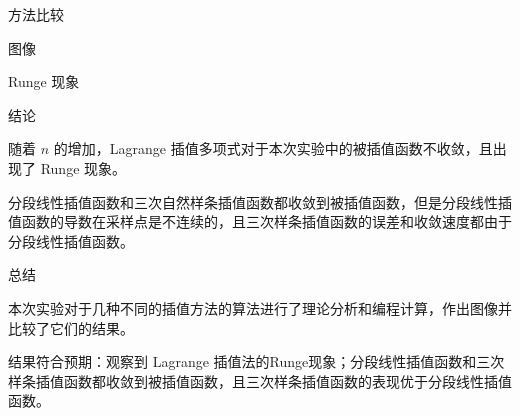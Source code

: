 \documentclass[a4paper]{article}
\begin{document}
\begin{multicols}{2}
\begin{section}{方法比较}
\begin{subsection}{图像}
\begin{subsubsection}{Runge 现象}
		\end{subsubsection}
		
	\end{subsection}
	
	\begin{subsection}{结论}
	
		随着 $n$ 的增加，Lagrange 插值多项式对于本次实验中的被插值函数不收敛，且出现了 Runge 现象。
		
		分段线性插值函数和三次自然样条插值函数都收敛到被插值函数，但是分段线性插值函数的导数在采样点是不连续的，且三次样条插值函数的误差和收敛速度都由于分段线性插值函数。
		
	\end{subsection}
	
\end{section}
	
\begin{section}{总结}
	
	本次实验对于几种不同的插值方法的算法进行了理论分析和编程计算，作出图像并比较了它们的结果。
	
	结果符合预期：观察到 Lagrange 插值法的Runge现象；分段线性插值函数和三次样条插值函数都收敛到被插值函数，且三次样条插值函数的表现优于分段线性插值函数。
	
\end{section}

\end{multicols}



%
%

\end{document}
